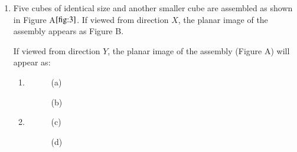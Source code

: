 \documentclass[journal]{IEEEtran}
\numberwithin{equation}{enumi}
\numberwithin{figure}{enumi}
\begin{document}
\begin{enumerate}
\begin{enumerate}
\end{enumerate}

\bigskip
\item
Five cubes of identical size and another smaller cube are assembled as shown in Figure A$\ref{fig:3}$. If viewed from direction $ X $, the planar image of the assembly appears as Figure B.

\begin{figure}[H]
    
			\centering
			
			\caption{}
			\label{fig:3}
		\end{figure}

If viewed from direction $ Y $, the planar image of the assembly (Figure A) will appear as:
\begin{enumerate}

    \item[]

    \begin{figure}[H]
        \centering

        \begin{minipage}{0.45\linewidth}
            \centering
            
            \caption*{(a)}
        \end{minipage}%
        \hfill
        \begin{minipage}{0.45\linewidth}
            \centering
            
            \caption*{(b)}
        \end{minipage}

    \end{figure}

    \item[]

    \begin{figure}[H]
        \centering

        \begin{minipage}{0.45\linewidth}
            \centering
            
            \caption*{(c)}
        \end{minipage}%
        \hfill
        \begin{minipage}{0.45\linewidth}
            \centering
            
            \caption*{(d)}
        \end{minipage}

    \end{figure}
    
\end{enumerate}

\bigskip



\end{enumerate}
\end{document}
